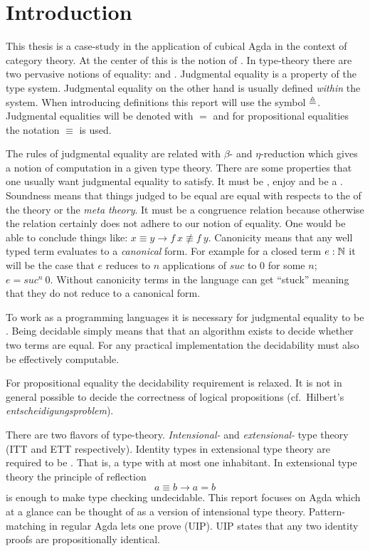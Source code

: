 \chapter{Introduction}
This thesis is a case-study in the application of cubical Agda in the
context of category theory. At the center of this is the notion of
. In type-theory there are two pervasive notions
of equality:  and
. Judgmental equality is a property
of the type system. Judgmental equality on the other hand is usually
defined \emph{within} the system. When introducing definitions this
report will use the symbol $\mathrel{\triangleq}$. Judgmental equalities will be
denoted with $=$ and for propositional equalities the notation
$\equiv$ is used.

The rules of judgmental equality are related with $β$- and
$η$-reduction which gives a notion of computation in a given type
theory.
%
There are some properties that one usually want judgmental equality to
satisfy. It must be , enjoy 
and be a . Soundness means that things
judged to be equal are equal with respects to the 
of the theory or the \emph{meta theory}. It must be a congruence
relation because otherwise the relation certainly does not adhere to
our notion of equality. One would be able to conclude things like: $x
\equiv y \rightarrow f\ x \nequiv f\ y$. Canonicity means that any
well typed term evaluates to a \emph{canonical} form. For example for
a closed term $e \mathrel{:} \mathbb{N}$ it will be the case that $e$ reduces to $n$
applications of $\mathit{suc}$ to $0$ for some $n$; $e =
\mathit{suc}^n\ 0$. Without canonicity terms in the language can get
``stuck'' meaning that they do not reduce to a canonical form.

To work as a programming languages it is necessary for judgmental
equality to be . Being decidable simply means
that that an algorithm exists to decide whether two terms are equal.
For any practical implementation the decidability must also be
effectively computable.

For propositional equality the decidability requirement is relaxed. It
is not in general possible to decide the correctness of logical
propositions (cf.\ Hilbert's \emph{entscheidigungsproblem}).

There are two flavors of type-theory. \emph{Intensional-} and
\emph{extensional-} type theory (ITT and ETT respectively). Identity
types in extensional type theory are required to be
. That is, a type with at most one
inhabitant. In extensional type theory the principle of reflection
%
$$a ≡ b → a = b$$
%
is enough to make type checking undecidable. This report focuses on
Agda which at a glance can be thought of as a version of intensional
type theory. Pattern-matching in regular Agda lets one prove
 (UIP). UIP states that any
two identity proofs are propositionally identical.

